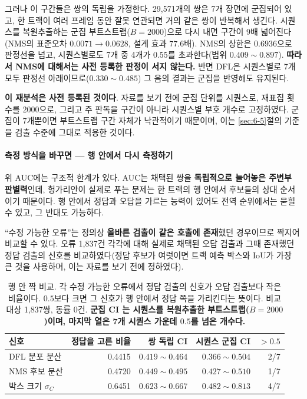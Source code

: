 \documentclass[12pt,a4paper,oneside]{report}
\begin{document}
그러나 이 구간들은 쌍의 독립을 가정한다. 29{,}571개의 쌍은 7개 장면에 군집되어 있고, 한 트랙이 여러 프레임 동안 잘못 연관되면 거의 같은 쌍이 반복해서 생긴다. 시퀀스를 복원추출하는 군집 부트스트랩($B = 2000$)으로 다시 내면 구간이 9배 넓어진다(NMS의 표준오차 $0.0071 \to 0.0628$, 설계 효과 $77.6$배). NMS의 상한은 $0.6936$으로 판정선을 넘고, 시퀀스별로도 7개 중 4개가 $0.55$를 초과한다(범위 $0.409 \sim 0.897$). \textbf{따라서 NMS에 대해서는 사전 등록한 판정이 서지 않는다.} 반면 DFL은 시퀀스별로 7개 모두 판정선 아래이므로($0.330 \sim 0.485$) 그 음의 결과는 군집을 반영해도 유지된다.

\textbf{이 재분석은 사전 등록된 것이다}. 자료를 보기 전에 군집 단위를 시퀀스로, 재표집 횟수를 $2000$으로, 그리고 주 판독을 구간이 아니라 시퀀스별 부호 개수로 고정하였다. 군집이 7개뿐이면 부트스트랩 구간 자체가 낙관적이기 때문이며, 이는 \ref{sec:6-5}절의 기준을 검출 수준에 그대로 적용한 것이다.

\paragraph{측정 방식을 바꾸면 --- 행 안에서 다시 측정하기} 위 AUC에는 구조적 한계가 있다. AUC는 채택된 쌍을 \textbf{독립적으로 늘어놓은 주변부 판별력}인데, 헝가리안이 실제로 푸는 문제는 한 트랙의 행 안에서 후보들의 상대 순서이기 때문이다. 행 안에서 정답과 오답을 가르는 능력이 있어도 전역 순위에서는 묻힐 수 있고, 그 반대도 가능하다.

``수정 가능한 오류''는 정의상 \textbf{올바른 검출이 같은 호출에 존재}했던 경우이므로 짝지어 비교할 수 있다. 오류 1{,}837건 각각에 대해 실제로 채택된 오답 검출과 그때 존재했던 정답 검출의 신호를 비교하였다(정답 후보가 여럿이면 트랙 예측 박스와 IoU가 가장 큰 것을 사용하며, 이는 자료를 보기 전에 정하였다).

\begin{table}[htbp]
\centering
\small
\caption{행 안 짝 비교. 각 수정 가능한 오류에서 정답 검출의 신호가 오답 검출보다 작은 비율이다. $0.5$보다 크면 그 신호가 행 안에서 정답 쪽을 가리킨다는 뜻이다. 비교 대상 1{,}837쌍, 동률 0건. \textbf{군집 CI 는 시퀀스를 복원추출한 부트스트랩($B=2000$)이며, 마지막 열은 7개 시퀀스 가운데 $0.5$를 넘은 개수다.}}
\label{tab:withinrow}
\begin{tabular}{lrrrr}
\toprule
신호 & 정답을 고른 비율 & 쌍 독립 CI & 시퀀스 군집 CI & $>0.5$ \\
\midrule
DFL 분포 분산 & 0.4415 & $0.419 \sim 0.464$ & $0.366 \sim 0.504$ & 2/7 \\
NMS 후보 분산 & 0.4720 & $0.449 \sim 0.495$ & $0.427 \sim 0.510$ & 1/7 \\
박스 크기 $\sigma_C$ & 0.6451 & $0.623 \sim 0.667$ & $\mathbf{0.482 \sim 0.813}$ & 4/7 \\
\bottomrule
\end{tabular}
\end{table}
\end{document}
